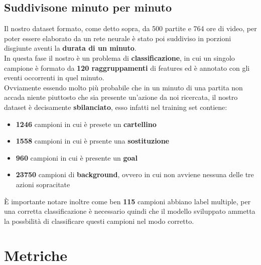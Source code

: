 \subsection{Suddivisone minuto per minuto}
Il nostro dataset formato, come detto sopra, da 500 partite e 764 ore di video, per poter essere elaborato da un rete neurale è stato poi suddiviso in porzioni disgiunte aventi la \textbf{durata di un minuto}.
\\In questa fase il nostro è un problema di \textbf{classificazione}, in cui un singolo campione è formato da \textbf{120 raggruppamenti} di features ed è annotato con gli eventi occorrenti in quel minuto.
\\Ovviamente essendo molto più probabile che in un minuto di una partita non accada niente piuttosto che sia presente un'azione da noi ricercata, il nostro dataset è decisamente \textbf{sbilanciato}, esso infatti nel training set contiene:
\begin{itemize}
\item \textbf{1246} campioni in cui è presete un \textbf{cartellino}
\item \textbf{1558} campioni in cui è prsente una \textbf{sostituzione}
\item \textbf{960} campioni in cui è presente un \textbf{goal}
\item \textbf{23750} campioni di \textbf{background}, ovvero in cui non avviene nessuna delle tre azioni sopracitate
\end{itemize}
È importante notare inoltre come ben \textbf{115} campioni abbiano label multiple, per una corretta classificazione è necessario quindi che il modello sviluppato ammetta la possbilità di classificare questi campioni nel modo corretto.
\section{Metriche}
